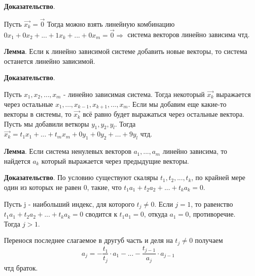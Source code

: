 \documentclass[a4paper]{article}
\begin{document}
    \begin{hproof}
        \textbf{Доказательство}.

        Пусть $\vec{x_k} = \vec{0}$
        Тогда можно взять линейную комбинацию $0x_1 + 0x_2 + ... + 1x_k + ... + 0x_m = \vec{0} \Rightarrow$ система векторов линейно зависима чтд.

    \end{hproof}


    \begin{htheorem}
        \textbf{Лемма}. Если к линейно зависимой системе добавить новые векторы, то система останется линейно зависимой.
    \end{htheorem}

    \begin{hproof}
        \textbf{Доказательство}.

        Пусть  $x_1, x_2, ..., x_m$ - линейно зависимая система. Тогда некоторый $\vec{x_k}$ выражается через остальные $x_1, ..., x_{k-1}, x_{k+1}, ..., x_m$. Если мы добавим еще какие-то векторы в системы, то $\vec{x_k}$ всё равно будет выражаться через остальные вектора. Пусть мы добавили веткоры $y_1, y_2, y_l$. Тогда $\vec{x_k} = t_1x_1 + ... + t_mx_m + 0y_1 +0y_2 + ... + 9y_l$ чтд.
    \end{hproof}

    \begin{htheorem}
        \textbf{Лемма}. Если система ненулевых векторов $a_1, ..., a_m$ линейно зависима, то найдется $a_k$ который выражается через предыдущие векторы.
    \end{htheorem}

    \begin{hproof}
        \textbf{Доказательство}. По условию существуют скаляры $t_1, t_2, ..., t_k$, по крайней мере один из которых не равен 0, такие, что $t_1a_1 + t_2a_2 + ... + t_ka_k = 0$.

        Пусть j - наибольший индекс, для которого $t_j \neq 0$. Если $j=1$, то равенство  $t_1a_1 + t_2a_2 + ... + t_ka_k = 0$ сводится к $t_1a_1 = 0$, откуда $a_1 = 0$, противоречие. Тогда $j>1$.

        Перенося последнее слагаемое в другуб часть и деля на $t_j \neq 0$ получаем \begin{equation}
                                                                                        \displaystyle a_j = -\frac{t_1}{t_j}\cdot a_1 - ... - \frac{t_{j-1}}{a_j} \cdot a_{j-1}
        \end{equation}
        чтд браток.
    \end{hproof}
\end{document}
